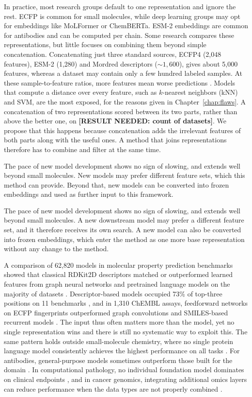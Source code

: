 In practice, most research groups default to one representation and ignore the rest. ECFP is common for small molecules, while deep learning groups may opt for embeddings like MoLFormer or ChemBERTa. ESM-2 embeddings are common for antibodies and can be computed per chain. Some research compares these representations, but little focuses on combining them beyond simple concatenation. Concatenating just three standard sources, ECFP4 (2,048 features), ESM-2 (1,280) and Mordred descriptors (${\sim}1{,}600$), gives about 5,000 features, whereas a dataset may contain only a few hundred labeled samples. At these sample-to-feature ratios, more features mean worse predictions \citep{Hughes1968, Bellman1961}. Models that compute a distance over every feature, such as $k$-nearest neighbors (kNN) and SVM, are the most exposed, for the reasons given in Chapter~\ref{chap:flaws}. A concatenation of two representations scored between its two parts, rather than above the better one, on \textbf{[RESULT NEEDED: count of datasets]}. We propose that this happens because concatenation adds the irrelevant features of both parts along with the useful ones. A method that joins representations therefore has to combine and filter at the same time.

The pace of new model development shows no sign of slowing, and extends well beyond small molecules. New models may prefer different feature sets, which this method can provide. Beyond that, new models can be converted into frozen embeddings and used as further input to this framework.

The pace of new model development shows no sign of slowing, and extends well beyond small molecules. A new downstream model may prefer a different feature set, and it therefore receives its own search. A new model can also be converted into frozen embeddings, which enter the method as one more base representation without any change to the method.

A comparison of 62,820 models in molecular property prediction benchmarks showed that classical RDKit2D descriptors matched or outperformed learned features from graph neural networks and pretrained language models on the majority of datasets \citep{Deng2023}. Descriptor-based models occupied 73\% of top-three positions on 11 benchmarks \citep{Jiang2021}, and in 1,310 ChEMBL assays, feedforward networks on ECFP fingerprints outperformed graph convolutions and SMILES-based recurrent models \citep{Mayr2018}. The input thus often matters more than the model, yet no single representation wins and there is still no systematic way to exploit this. The same pattern holds outside small-molecule chemistry, where no single protein language model consistently achieves the highest performance on all tasks \citep{Kenlay2024, Schmirler2024}. For antibodies, general-purpose models sometimes outperform those built for the domain \citep{Kenlay2024}. In computational pathology, no individual foundation model dominates on clinical endpoints \citep{ElNahhas2025}, and in cancer genomics, integrating additional omics layers can reduce performance when the data types are not properly combined \citep{Steyaert2023}.

